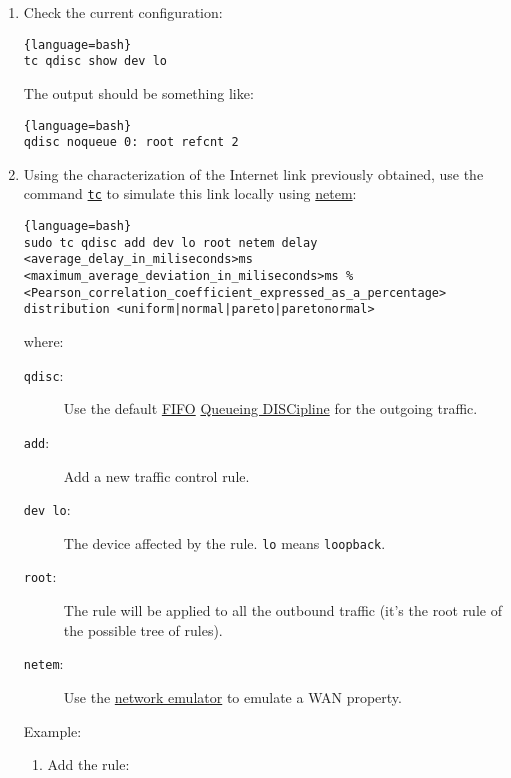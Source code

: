 \begin{enumerate}

\item Check the current configuration:
  
  \begin{lstlisting}{language=bash}
tc qdisc show dev lo
  \end{lstlisting}
  
  The output should be something like:
  
  \begin{lstlisting}{language=bash}
qdisc noqueue 0: root refcnt 2
  \end{lstlisting}
  
\item Using the characterization of the Internet link previously
  obtained, use the command
  \href{https://man7.org/linux/man-pages/man8/tc.8.html}{\texttt{tc}}
  to simulate this link locally using
  \href{https://man7.org/linux/man-pages/man8/tc-netem.8.html}{netem}:

  \begin{lstlisting}{language=bash}
sudo tc qdisc add dev lo root netem delay <average_delay_in_miliseconds>ms <maximum_average_deviation_in_miliseconds>ms %<Pearson_correlation_coefficient_expressed_as_a_percentage> distribution <uniform|normal|pareto|paretonormal>
  \end{lstlisting}
  where:
  \begin{description}
  \item [\texttt{qdisc}:] Use the default
    \href{https://en.wikipedia.org/wiki/FIFO_(computing_and_electronics)}{FIFO}
    \href{https://wiki.debian.org/TrafficControl}{Queueing DISCipline}
    for the outgoing traffic.
  \item [\texttt{add}:] Add a new traffic control rule.
  \item [\texttt{dev lo}:] The device affected by the
    rule. \texttt{lo} means \texttt{loopback}.
  \item [\texttt{root}:] The rule will be applied to all the outbound
    traffic (it's the root rule of the possible tree of rules).
  \item [\texttt{netem}:] Use the
    \href{https://wiki.linuxfoundation.org/networking/netem}{network
      emulator} to emulate a WAN property.
  \end{description}

  Example:

  \begin{enumerate}
  \item Add the rule:
    

\end{enumerate}
\end{enumerate}
